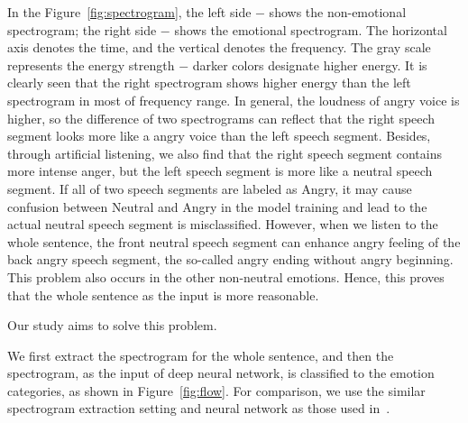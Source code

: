 \documentclass[a4paper]{article}
\begin{document}
In the Figure~\ref{fig:spectrogram}, the left side $-$ shows the non-emotional spectrogram; the right side $-$ shows the emotional spectrogram. The horizontal axis denotes the time, and the vertical denotes the frequency. The gray scale represents the energy strength $-$ darker colors designate higher energy. It is clearly seen that the right spectrogram shows higher energy than the left spectrogram in most of frequency range. In general, the loudness of angry voice is higher, so the difference of two spectrograms can reflect that the right speech segment looks more like a angry voice than the left speech segment. Besides, through artificial listening, we also find that the right speech segment contains more intense anger, but the left speech segment is more like a neutral speech segment. If all of two speech segments are labeled as Angry, it may cause confusion between Neutral and Angry in the model training and lead to the actual neutral speech segment is misclassified. However, when we listen to the whole sentence, the front neutral speech segment can enhance angry feeling of the back angry speech segment, the so-called angry ending without angry beginning. This problem also occurs in the other non-neutral emotions. Hence, this proves that the whole sentence as the input is more reasonable.

Our study aims to solve this problem. 





We first extract the spectrogram for the whole sentence, and then the spectrogram, as the input of deep neural network, is classified to the emotion categories, as shown in Figure~\ref{fig:flow}. For comparison, we use the similar spectrogram extraction setting and neural network as those used in~\cite{satt2017}.
\end{document}
